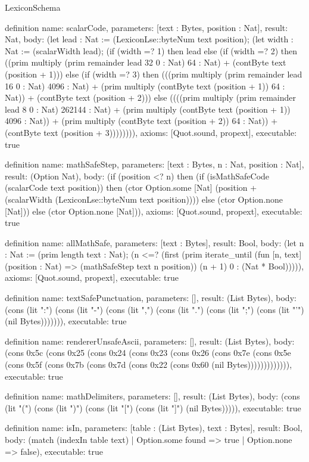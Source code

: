 \begin{lexlean}{LexiconSchema}
\begin{semanticmodule}
definition{
  name: scalarCode,
  parameters: [text : Bytes, position : Nat],
  result: Nat,
  body: (let lead : Nat := (LexiconLse::byteNum text position); (let width : Nat := (scalarWidth lead); (if (width =? 1) then lead else (if (width =? 2) then ((prim multiply (prim remainder lead 32 0 : Nat) 64 : Nat) + (contByte text (position + 1))) else (if (width =? 3) then (((prim multiply (prim remainder lead 16 0 : Nat) 4096 : Nat) + (prim multiply (contByte text (position + 1)) 64 : Nat)) + (contByte text (position + 2))) else ((((prim multiply (prim remainder lead 8 0 : Nat) 262144 : Nat) + (prim multiply (contByte text (position + 1)) 4096 : Nat)) + (prim multiply (contByte text (position + 2)) 64 : Nat)) + (contByte text (position + 3)))))))),
  axioms: [Quot.sound, propext],
  executable: true
}

definition{
  name: mathSafeStep,
  parameters: [text : Bytes, n : Nat, position : Nat],
  result: (Option Nat),
  body: (if (position <? n) then (if (isMathSafeCode (scalarCode text position)) then (ctor Option.some [Nat] (position + (scalarWidth (LexiconLse::byteNum text position)))) else (ctor Option.none [Nat])) else (ctor Option.none [Nat])),
  axioms: [Quot.sound, propext],
  executable: true
}

definition{
  name: allMathSafe,
  parameters: [text : Bytes],
  result: Bool,
  body: (let n : Nat := (prim length text : Nat); (n <=? (first (prim iterate_until (fun [n, text] (position : Nat) => (mathSafeStep text n position)) (n + 1) 0 : (Nat * Bool))))),
  axioms: [Quot.sound, propext],
  executable: true
}

definition{
  name: textSafePunctuation,
  parameters: [],
  result: (List Bytes),
  body: (cons (lit ":") (cons (lit "-") (cons (lit ",") (cons (lit ".") (cons (lit ";") (cons (lit "'") (nil Bytes))))))),
  executable: true
}

definition{
  name: rendererUnsafeAscii,
  parameters: [],
  result: (List Bytes),
  body: (cons 0x5c (cons 0x25 (cons 0x24 (cons 0x23 (cons 0x26 (cons 0x7e (cons 0x5e (cons 0x5f (cons 0x7b (cons 0x7d (cons 0x22 (cons 0x60 (nil Bytes))))))))))))),
  executable: true
}

definition{
  name: mathDelimiters,
  parameters: [],
  result: (List Bytes),
  body: (cons (lit "(") (cons (lit ")") (cons (lit "[") (cons (lit "]") (nil Bytes))))),
  executable: true
}

definition{
  name: isIn,
  parameters: [table : (List Bytes), text : Bytes],
  result: Bool,
  body: (match (indexIn table text) | Option.some found => true | Option.none => false),
  executable: true
}


\end{semanticmodule}
\end{lexlean}
